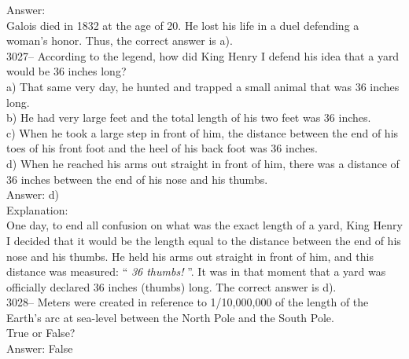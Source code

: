 \documentclass[letterpaper, 12pt]{article}
\begin{document}
Answer:\\
Galois died in 1832 at the age of 20. He lost his life in a duel defending a woman's honor. Thus, the correct answer is a).\\



3027-- According to the legend, how did King Henry I defend his idea that a yard would be 36 inches long?\\

a) That same very day, he hunted and trapped a small animal that was 36 inches long.\\
b) He had very large feet and the total length of his two feet was 36 inches.\\
c) When he took a large step in front of him, the distance between the end of his toes of his front foot and the heel of his back foot was 36 inches.\\
d) When he reached his arms out straight in front of him, there was a distance of 36 inches between the end of his nose and his thumbs.\\

Answer: d)\\

Explanation:\\
One day, to end all confusion on what was the exact length of a yard, King Henry I decided that it would be the length equal to the distance between the end of his nose and his thumbs. He held his arms out straight in front of him, and this distance was measured: `` \emph{36 thumbs!} ''. It was in that moment that a yard was officially declared 36 inches (thumbs) long. The correct answer is d).\\



3028-- Meters were created in reference to 1/10,000,000 of the length of the Earth's arc at sea-level between the North Pole and the South Pole.\\
True or False?\\

Answer: False\\
\end{document}
